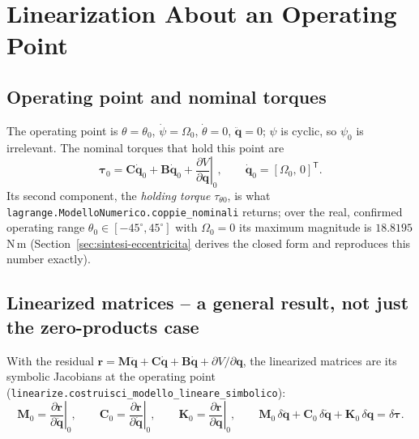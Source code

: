 \documentclass[11pt,a4paper]{article}
\numberwithin{equation}{section}
\newcommand{\bs}[1]{\boldsymbol{#1}}
\newcommand{\T}{^{\mathsf T}}
\begin{document}
\section{Linearization About an Operating Point}
\label{sec:linearizzazione}

\subsection{Operating point and nominal torques}
\label{subsec:lin-punto}

The operating point is $\theta=\theta_0$, $\dot\psi=\Omega_0$, $\dot\theta=0$, $\ddot{\bs q}=0$; $\psi$ is cyclic, so $\psi_0$ is irrelevant. The nominal torques that hold this point are
\begin{equation}
\bs\tau_0 = \bs C\dot{\bs q}_0 + \bs B\dot{\bs q}_0 + \left.\frac{\partial V}{\partial\bs q}\right|_0 , \qquad \dot{\bs q}_0=[\Omega_0,\,0]\T .
\label{eq:tau0}
\end{equation}
Its second component, the \emph{holding torque} $\tau_{\theta0}$, is what \texttt{lagrange.\allowbreak ModelloNumerico.\allowbreak coppie\_\allowbreak nominali} returns; over the real, confirmed operating range $\theta_0\in[-45^\circ,45^\circ]$ with $\Omega_0=0$ its maximum magnitude is $18.8195$\,N\,m (Section~\ref{sec:sintesi-eccentricita} derives the closed form and reproduces this number exactly).

\subsection{Linearized matrices -- a general result, not just the zero-products case}
\label{subsec:lin-matrici}

With the residual $\bs r = \bs M\ddot{\bs q}+\bs C\dot{\bs q}+\bs B\dot{\bs q}+\partial V/\partial\bs q$, the linearized matrices are its symbolic Jacobians at the operating point (\texttt{linearize.\allowbreak costruisci\_\allowbreak modello\_\allowbreak lineare\_\allowbreak simbolico}):
\begin{equation}
\bs M_0 = \left.\frac{\partial\bs r}{\partial\ddot{\bs q}}\right|_0,\qquad
\bs C_0 = \left.\frac{\partial\bs r}{\partial\dot{\bs q}}\right|_0,\qquad
\bs K_0 = \left.\frac{\partial\bs r}{\partial\bs q}\right|_0,
\qquad
\bs M_0\,\delta\ddot{\bs q} + \bs C_0\,\delta\dot{\bs q} + \bs K_0\,\delta\bs q = \delta\bs\tau .
\label{eq:lin-eom}
\end{equation}
\end{document}
